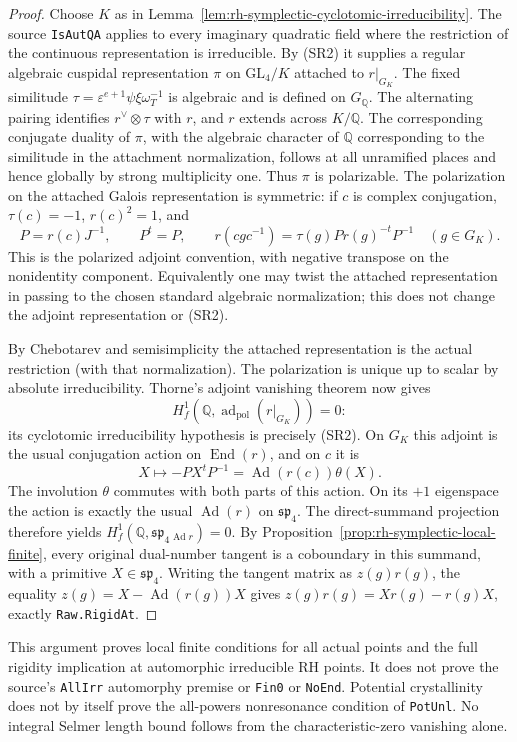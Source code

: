 \begin{proof}
Choose \(K\) as in Lemma~\ref{lem:rh-symplectic-cyclotomic-irreducibility}.
The source \texttt{IsAutQA} applies to every imaginary quadratic
field where the restriction of the continuous representation
is irreducible. By (SR2) it supplies a regular algebraic
cuspidal representation \(\pi\) on \(\mathrm{GL}_4/K\)
attached to \(r|_{G_K}\).
The fixed similitude \(\tau=\varepsilon^{e+1}\psi\xi\omega_T^{-1}\)
is algebraic and is defined on \(G_{\mathbb Q}\).
The alternating pairing identifies \(r^\vee\otimes\tau\)
with \(r\), and \(r\) extends across \(K/\mathbb Q\).
The corresponding conjugate duality of \(\pi\), with the
algebraic character of \(\mathbb Q\) corresponding to the
similitude in the attachment normalization, follows at all
unramified places and hence globally by strong multiplicity one.
Thus \(\pi\) is polarizable. The polarization on the attached
Galois representation is symmetric: if \(c\) is complex
conjugation, \(\tau(c)=-1\), \(r(c)^2=1\), and
\[
 P=r(c)J^{-1},\qquad
 P^t=P,\qquad
 r(cgc^{-1})=\tau(g)P r(g)^{-t}P^{-1}\quad(g\in G_K).
 \tag{SR3}
\]
This is the polarized adjoint convention, with negative transpose
on the nonidentity component. Equivalently one may twist the
attached representation in passing to the chosen standard
algebraic normalization; this does not change the adjoint
representation or (SR2).

By Chebotarev and semisimplicity the attached representation
is the actual restriction (with that normalization).
The polarization is unique up to scalar by absolute irreducibility.
Thorne's adjoint vanishing theorem
\cite[Theorem~6.1]{support-type-one-thorne} now gives
\[
 H^1_f(\mathbb Q,\operatorname{ad}_{\mathrm{pol}}(r|_{G_K}))=0:
\]
its cyclotomic irreducibility hypothesis is precisely (SR2).
On \(G_K\) this adjoint is the usual conjugation action on
\(\operatorname{End}(r)\), and on \(c\) it is
\[
 X\longmapsto-PX^tP^{-1}
   =\operatorname{Ad}(r(c))\theta(X).
\]
The involution \(\theta\) commutes with both parts of this action.
On its \(+1\) eigenspace the action is exactly the usual
\(\operatorname{Ad}(r)\) on \(\mathfrak{sp}_4\).
The direct-summand projection therefore yields
\(H^1_f(\mathbb Q,\mathfrak{sp}_4{}_{\operatorname{Ad}r})=0\).
By Proposition~\ref{prop:rh-symplectic-local-finite},
every original dual-number tangent is a coboundary in this
summand, with a primitive \(X\in\mathfrak{sp}_4\).
Writing the tangent matrix as \(z(g)r(g)\), the equality
\(z(g)=X-\operatorname{Ad}(r(g))X\) gives
\(z(g)r(g)=Xr(g)-r(g)X\), exactly \texttt{Raw.RigidAt}.
\end{proof}

This argument proves local finite conditions for all actual points
and the full rigidity implication at automorphic irreducible RH
points. It does not prove the source's \texttt{AllIrr} automorphy
premise or \texttt{Fin0} or \texttt{NoEnd}. Potential crystallinity
does not by itself prove the all-powers nonresonance condition of
\texttt{PotUnl}. No integral Selmer length bound follows from the
characteristic-zero vanishing alone.
